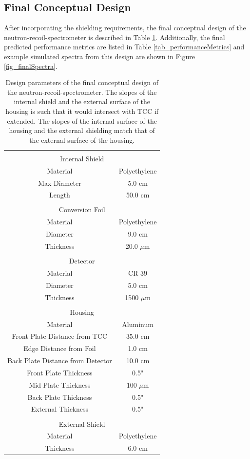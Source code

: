 \subsection{Final Conceptual Design}

After incorporating the shielding requirements, the final conceptual design of the neutron-recoil-spectrometer is described in Table \ref{tab_designParameters}. Additionally, the final predicted performance metrics are listed in Table \ref{tab_performanceMetrics} and example simulated spectra from this design are shown in Figure \ref{fig_finalSpectra}. 

\begin{table}[!h]
	\caption{Design parameters of the final conceptual design of the neutron-recoil-spectrometer. The slopes of the internal shield and the external surface of the housing is such that it would intersect with TCC if extended. The slopes of the internal surface of the housing and the external shielding match that of the external surface of the housing. }
	\label{tab_designParameters}
	\renewcommand{\arraystretch}{1.2}
	\centering
	\begin{tabular}{  c c  }
		&\\
		\multicolumn{2}{c}{Internal Shield} \\\hline
		Material & Polyethylene \\
		Max Diameter & 5.0 cm \\
		Length	& 50.0 cm \\
		&\\
		\multicolumn{2}{c}{Conversion Foil} \\\hline
		Material & Polyethylene \\
		Diameter & 9.0 cm \\
		Thickness	& 20.0 $\mu$m \\
		&\\
		\multicolumn{2}{c}{Detector} \\\hline
		Material & CR-39 \\
		Diameter & 5.0 cm \\
		Thickness	& 1500 $\mu$m \\
		&\\
		\multicolumn{2}{c}{Housing} \\\hline
		Material & Aluminum \\
		Front Plate Distance from TCC & 35.0 cm \\
		Edge Distance from Foil & 1.0 cm \\			 
		Back Plate Distance from Detector & 10.0 cm \\	
		Front Plate Thickness & 0.5" \\
		Mid Plate Thickness & 100 $\mu$m \\
		Back Plate Thickness & 0.5" \\
		External Thickness & 0.5" \\
		&\\
		\multicolumn{2}{c}{External Shield} \\\hline
		Material & Polyethylene \\
		Thickness	& 6.0 cm \\
	\end{tabular}		
\end{table}

